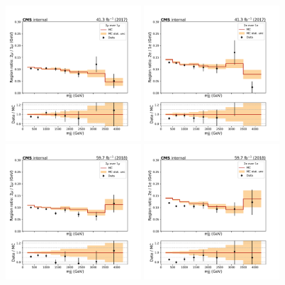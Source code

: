 \begin{figure}[htbp]
  \centering
  \includegraphics[width=0.45\textwidth]{fig/datamc/ratios/ratio_losf_mjj_cr_2m_vbf_over_cr_1m_vbf_2017.pdf}
  \includegraphics[width=0.45\textwidth]{fig/datamc/ratios/ratio_losf_mjj_cr_2e_vbf_over_cr_1e_vbf_2017.pdf} \\
  \includegraphics[width=0.45\textwidth]{fig/datamc/ratios/ratio_losf_mjj_cr_2m_vbf_over_cr_1m_vbf_2018.pdf}
  \includegraphics[width=0.45\textwidth]{fig/datamc/ratios/ratio_losf_mjj_cr_2e_vbf_over_cr_1e_vbf_2018.pdf}

\end{figure}
